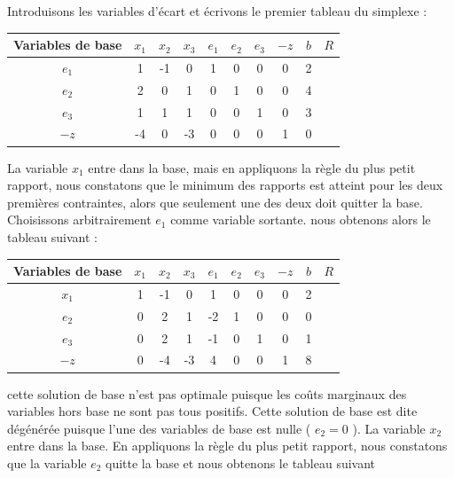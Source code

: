 \documentclass[a4paper,12pt,openany]{book}
\theoremstyle{plain}
\theoremstyle{definition}
\theoremstyle{remark}
\theoremstyle{nbstyle}
\begin{document}
	Introduisons les variables d'écart et écrivons le premier tableau du simplexe :
	
	\begin{center}
		\begin{tabular}{|c|ccccccc|c|c|}
			\hline
			Variables de base & $x_{1}$ & $x_{2}$ & $x_{3}$ & $e_{1}$ & $e_{2}$ & $e_{3}$ & $-z$ & $b$ & $R$ \\
			\hline
			$e_{1}$ & 1 & -1 & 0 & 1 & 0 & 0 & 0 & 2 &  \\
			$e_{2}$ & 2 & 0 & 1 & 0 & 1 & 0 & 0 & 4 &  \\
			$e_{3}$ & 1 & 1 & 1 & 0 & 0 & 1 & 0 & 3 &  \\
			\hline
			$-z$ & -4 & 0 & -3 & 0 & 0 & 0 & 1 & 0 &  \\
			\hline
		\end{tabular}
	\end{center}
	
	La variable $x_{1}$ entre dans la base, mais en appliquons la règle du plus petit rapport, nous constatons que le minimum des rapports est atteint pour les deux premières contraintes, alors que seulement une des deux doit quitter la base. Choisissons arbitrairement $e_{1}$ comme variable sortante. nous obtenons alors le tableau suivant :
	
	\begin{center}
		\begin{tabular}{|c|ccccccc|c|c|}
			\hline
			Variables de base & $x_{1}$ & $x_{2}$ & $x_{3}$ & $e_{1}$ & $e_{2}$ & $e_{3}$ & $-z$ & $b$ & $R$ \\
			\hline
			$x_{1}$ & 1 & -1 & 0 & 1 & 0 & 0 & 0 & 2 &  \\
			$e_{2}$ & 0 & 2 & 1 & -2 & 1 & 0 & 0 & 0 &  \\
			$e_{3}$ & 0 & 2 & 1 & -1 & 0 & 1 & 0 & 1 &  \\
			\hline
			$-z$ & 0 & -4 & -3 & 4 & 0 & 0 & 1 & 8 &  \\
			\hline
		\end{tabular}
	\end{center}
	
	cette solution de base n'est pas optimale puisque les coûts marginaux des variables hors base ne sont pas tous positifs. Cette solution de base est dite dégénérée puisque l'une des variables de base est nulle ( $e_{2}=0$ ). La variable $x_{2}$ entre dans la base. En appliquons la règle du plus petit rapport, nous constatons que la variable $e_{2}$ quitte la base et nous obtenons le tableau suivant
	
\end{document}
